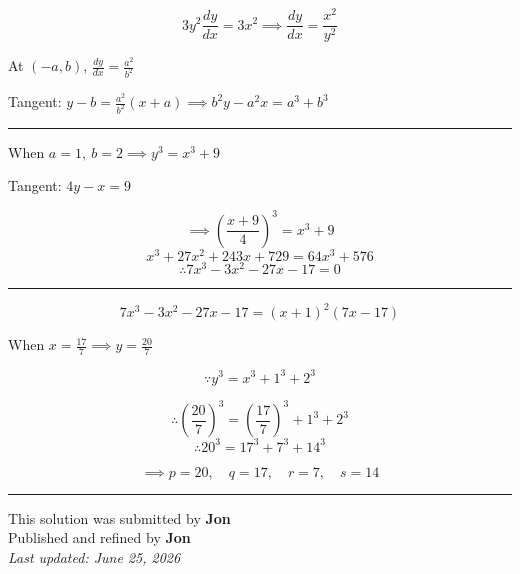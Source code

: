 \documentclass[12pt]{article}
\begin{document}
\newcommand{\ds}{\displaystyle}


$$3y^2\frac{dy}{dx}=3x^2 \implies \frac{dy}{dx}=\frac{x^2}{y^2}$$

At $(-a,b)$, $\ds \frac{dy}{dx}=\frac{a^2}{b^2}$

Tangent:  $\ds y-b=\frac{a^2}{b^2}(x+a)\implies b^2y-a^2x=a^3+b^3$

\bigskip\hrule\bigskip

When $a=1,\ b=2 \implies y^3=x^3+9$

Tangent: $4y-x=9$

$$\implies \left(\frac{x+9}{4}\right)^3=x^3+9$$
$$x^3+27x^2+243x+729=64x^3+576$$
$$\therefore 7x^3-3x^2-27x-17=0$$

\bigskip\hrule\bigskip

$$7x^3-3x^2-27x-17=(x+1)^2(7x-17)$$

When $\ds x=\frac{17}{7}\implies y=\frac{20}{7}$

$$\because y^3=x^3+1^3+2^3$$

$$\therefore \left(\frac{20}{7}\right)^3=\left(\frac{17}{7}\right)^3+1^3+2^3$$
$$\therefore20^3=17^3+7^3+14^3$$

$$\implies \boxed{p=20,\quad q=17,\quad r=7,\quad s=14}$$

\bigskip
\hrule
\begin{center}
    This solution was submitted by \textbf{Jon}\\[4pt]
    Published and refined by \textbf{Jon}\\[8pt]
    \textit{Last updated: June 25, 2026}
\end{center}
\end{document}

